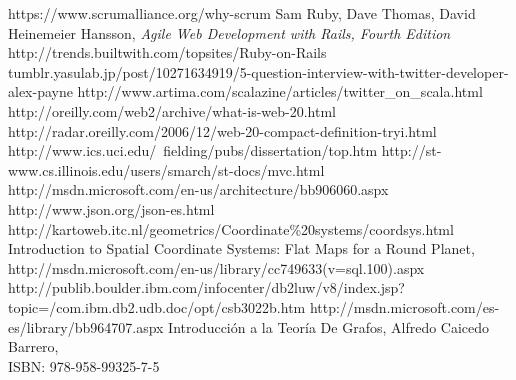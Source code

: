 \begin{thebibliography}{99}
   https://www.scrumalliance.org/why-scrum
   Sam Ruby, Dave Thomas, David Heinemeier Hansson, \emph{Agile Web Development with Rails, Fourth Edition}
    http://trends.builtwith.com/topsites/Ruby-on-Rails
   tumblr.yasulab.jp/post/10271634919/5-question-interview-with-twitter-developer-alex-payne
   http://www.artima.com/scalazine/articles/twitter\_on\_scala.html
   http://oreilly.com/web2/archive/what-is-web-20.html
   http://radar.oreilly.com/2006/12/web-20-compact-definition-tryi.html
   http://www.ics.uci.edu/~fielding/pubs/dissertation/top.htm
   http://st-www.cs.illinois.edu/users/smarch/st-docs/mvc.html
   http://msdn.microsoft.com/en-us/architecture/bb906060.aspx
   http://www.json.org/json-es.html
   http://kartoweb.itc.nl/geometrics/Coordinate\%20systems/coordsys.html
   Introduction to Spatial Coordinate Systems: Flat Maps for a Round Planet,\\ http://msdn.microsoft.com/en-us/library/cc749633(v=sql.100).aspx
   http://publib.boulder.ibm.com/infocenter/db2luw/v8/index.jsp?\\topic=/com.ibm.db2.udb.doc/opt/csb3022b.htm
   http://msdn.microsoft.com/es-es/library/bb964707.aspx
   Introducción a la Teoría De Grafos, Alfredo Caicedo Barrero, \\ISBN: 978-958-99325-7-5



\end{thebibliography}
